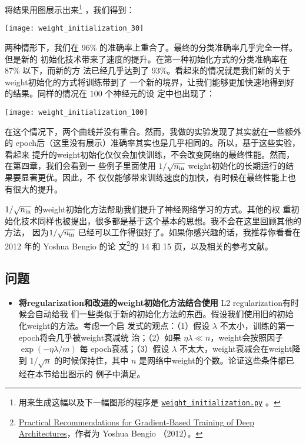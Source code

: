 将结果用图展示出来\footnote{用来生成这幅以及下一幅图形的程序是
  \href{https://github.com/mnielsen/neural-networks-and-deep-learning/blob/master/fig/weight_initialization.py}{\lstinline!weight_initialization.py!}
  。} ，我们得到：
\begin{center}
    \texttt{[image: weight\_initialization\_30]}
\end{center}

两种情形下，我们在 96\% 的准确率上重合了。最终的分类准确率几乎完全一样。但是新的
初始化技术带来了速度的提升。在第一种初始化方式的分类准确率在 87\% 以下，而新的方
法已经几乎达到了 93\%。看起来的情况就是我们新的关于\gls*{weight}初始化的方式将训练带到了
一个新的境界，让我们能够更加快速地得到好的结果。同样的情况在 $100$ 个神经元的设
定中也出现了：
\begin{center}
    \texttt{[image: weight\_initialization\_100]}
\end{center}

在这个情况下，两个曲线并没有重合。然而，我做的实验发现了其实就在一些额外的%
\gls*{epoch}后（这里没有展示）准确率其实也是几乎相同的。所以，基于这些实验，看起来
提升的\gls*{weight}初始化仅仅会加快训练，不会改变网络的最终性能。然而，在第四章，我们会看到一
些例子里面使用 $1/\sqrt{n_{\rm in}}$ \gls*{weight}初始化的长期运行的结果要显著更优。因此，不
仅仅能够带来训练速度的加快，有时候在最终性能上也有很大的提升。

$1/\sqrt{n_{\rm in}}$ 的\gls*{weight}初始化方法帮助我们提升了神经网络学习的方式。其他的权
重初始化技术同样也被提出，很多都是基于这个基本的思想。我不会在这里回顾其他的方法，
因为$1/\sqrt{n_{\rm in}}$ 已经可以工作得很好了。如果你感兴趣的话，我推荐你看看在
2012 年的 Yoshua Bengio 的论
文\footnote{\href{http://arxiv.org/pdf/1206.5533v2.pdf}{Practical
    Recommendations for Gradient-Based Training of Deep Architectures}，作者为
  Yoshua Bengio （2012）。}的 14 和 15 页，以及相关的参考文献。

\subsection*{问题}

\begin{itemize}
\item \textbf{将\gls*{regularization}和改进的\gls*{weight}初始化方法结合使用} L2 \gls*{regularization}有时候会自动给我
  们一些类似于新的初始化方法的东西。假设我们使用旧的初始化\gls*{weight}的方法。考虑一个启
  发式的观点：（1）假设 $\lambda$ 不太小，训练的第一\gls*{epoch}将会几乎被\gls*{weight}衰减统
  治；（2）如果 $\eta \lambda \ll n$，\gls*{weight}会按照因子 $\exp(-\eta \lambda / m)$ 每
  \gls*{epoch}衰减；（3）假设 $\lambda$ 不太大，\gls*{weight}衰减会在\gls*{weight}降到 $1/\sqrt{n}$
  的时候保持住，其中 $n$ 是网络中\gls*{weight}的个数。论证这些条件都已经在本节给出图示的
  例子中满足。
\end{itemize}

